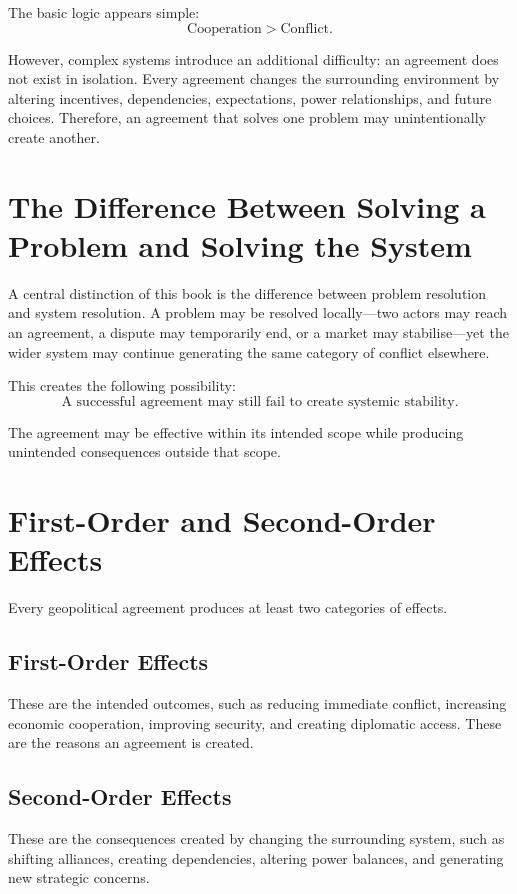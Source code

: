 \documentclass[11pt,openany]{book}
\theoremstyle{plain}
\theoremstyle{definition}
\begin{document}
The basic logic appears simple:
\[
\text{Cooperation}
>
\text{Conflict}.
\]

However, complex systems introduce an additional difficulty: an agreement does not exist in isolation. Every agreement changes the surrounding environment by altering incentives, dependencies, expectations, power relationships, and future choices. Therefore, an agreement that solves one problem may unintentionally create another.

\section*{The Difference Between Solving a Problem and Solving the System}

A central distinction of this book is the difference between problem resolution and system resolution. A problem may be resolved locally—two actors may reach an agreement, a dispute may temporarily end, or a market may stabilise—yet the wider system may continue generating the same category of conflict elsewhere.

This creates the following possibility:
\[
\boxed{
\text{A successful agreement may still fail to create systemic stability.}
}
\]

The agreement may be effective within its intended scope while producing unintended consequences outside that scope.

\section*{First-Order and Second-Order Effects}

Every geopolitical agreement produces at least two categories of effects.

\subsection*{First-Order Effects}

These are the intended outcomes, such as reducing immediate conflict, increasing economic cooperation, improving security, and creating diplomatic access. These are the reasons an agreement is created.

\subsection*{Second-Order Effects}

These are the consequences created by changing the surrounding system, such as shifting alliances, creating dependencies, altering power balances, and generating new strategic concerns. 
\end{document}
